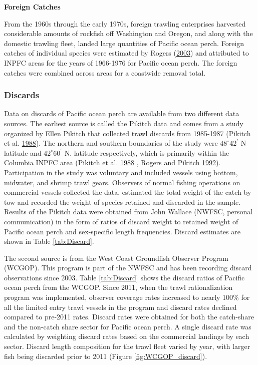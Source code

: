 \documentclass[12pt,]{article}
\begin{document}
\textbf{Foreign Catches}

From the 1960s through the early 1970s, foreign trawling enterprises
harvested considerable amounts of rockfish off Washington and Oregon,
and along with the domestic trawling fleet, landed large quantities of
Pacific ocean perch. Foreign catches of individual species were
estimated by Rogers (\protect\hyperlink{ref-rogers_species_2003}{2003})
and attributed to INPFC areas for the years of 1966-1976 for Pacific
ocean perch. The foreign catches were combined across areas for a
coastwide removal total.

\subsubsection{Discards}\label{discards}

Data on discards of Pacific ocean perch are available from two different
data sources. The earliest source is called the Pikitch data and comes
from a study organized by Ellen Pikitch that collected trawl discards
from 1985-1987 (Pikitch et al.
\protect\hyperlink{ref-pikitch_evaluation_1988}{1988}). The northern and
southern boundaries of the study were \(48^\circ 42^\prime\) N latitude
and \(42^\circ 60^\prime\) N. latitude respectively, which is primarily
within the Columbia INPFC area (Pikitch et al.
\protect\hyperlink{ref-pikitch_evaluation_1988}{1988} , Rogers and
Pikitch \protect\hyperlink{ref-rogers_numerical_1992}{1992}).
Participation in the study was voluntary and included vessels using
bottom, midwater, and shrimp trawl gears. Observers of normal fishing
operations on commercial vessels collected the data, estimated the total
weight of the catch by tow and recorded the weight of species retained
and discarded in the sample. Results of the Pikitch data were obtained
from John Wallace (NWFSC, personal communication) in the form of ratios
of discard weight to retained weight of Pacific ocean perch and
sex-specific length frequencies. Discard estimates are shown in Table
\ref{tab:Discard}.

The second source is from the West Coast Groundfish Observer Program
(WCGOP). This program is part of the NWFSC and has been recording
discard observations since 2003. Table \ref{tab:Discard} shows the
discard ratios of Pacific ocean perch from the WCGOP. Since 2011, when
the trawl rationalization program was implemented, observer coverage
rates increased to nearly 100\% for all the limited entry trawl vessels
in the program and discard rates declined compared to pre-2011 rates.
Discard rates were obtained for both the catch-share and the non-catch
share sector for Pacific ocean perch. A single discard rate was
calculated by weighting discard rates based on the commercial landings
by each sector. Discard length composition for the trawl fleet varied by
year, with larger fish being discarded prior to 2011 (Figure
\ref{fig:WCGOP_discard}).
\end{document}
